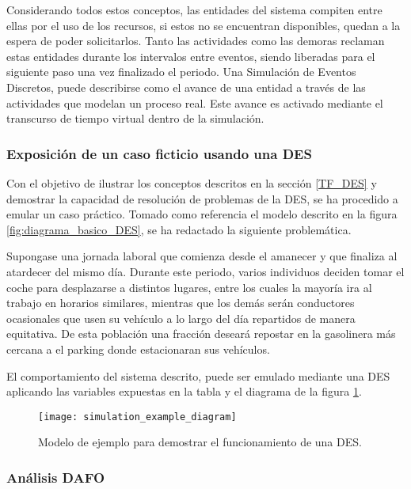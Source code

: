 Considerando todos estos conceptos, las entidades del sistema compiten entre ellas por el uso de los recursos, si estos no se encuentran disponibles, quedan a la espera de poder solicitarlos. Tanto las actividades como las demoras reclaman estas entidades durante los intervalos entre eventos, siendo liberadas para el siguiente paso una vez finalizado el periodo. Una Simulación de Eventos Discretos, puede describirse como el avance de una entidad a través de las actividades que modelan un proceso real. Este avance es activado mediante el transcurso de tiempo virtual dentro de la simulación.

\subsubsection{Exposición de un caso ficticio usando una DES}
Con el objetivo de ilustrar los conceptos descritos en la sección \ref{TF_DES} y demostrar la capacidad de resolución de problemas de la DES, se ha procedido a emular un caso práctico. Tomado como referencia el modelo descrito en la figura \ref{fig:diagrama_basico_DES}, se ha redactado la siguiente problemática.

Supongase una jornada laboral que comienza desde el amanecer y que finaliza al atardecer del mismo día. Durante este periodo, varios individuos deciden tomar el coche para desplazarse a distintos lugares, entre los cuales la mayoría ira al trabajo en horarios similares, mientras que los demás serán conductores ocasionales que usen su vehículo a lo largo del día repartidos de manera equitativa. De esta población una fracción deseará repostar en la gasolinera más cercana a el parking donde estacionaran sus vehículos.

El comportamiento del sistema descrito, puede ser emulado mediante una DES aplicando las variables expuestas en la tabla y el diagrama de la figura \ref{fig:simulation_example_diagram}.

\begin{figure}
    \begin{center}
        \texttt{[image: simulation\_example\_diagram]}
    \end{center}
    \caption{Modelo de ejemplo para demostrar el funcionamiento de una DES.}
    \label{fig:simulation_example_diagram}
\end{figure}

\subsubsection{Análisis DAFO}

